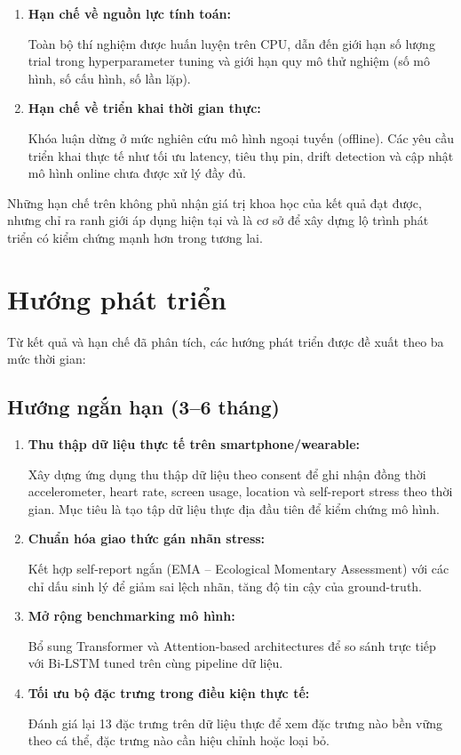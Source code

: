 \begin{enumerate}
    \item \textbf{Hạn chế về nguồn lực tính toán:}
    
    Toàn bộ thí nghiệm được huấn luyện trên CPU, dẫn đến giới hạn số lượng trial trong hyperparameter tuning và giới hạn quy mô thử nghiệm (số mô hình, số cấu hình, số lần lặp).

    \item \textbf{Hạn chế về triển khai thời gian thực:}
    
    Khóa luận dừng ở mức nghiên cứu mô hình ngoại tuyến (offline). Các yêu cầu triển khai thực tế như tối ưu latency, tiêu thụ pin, drift detection và cập nhật mô hình online chưa được xử lý đầy đủ.
\end{enumerate}

Những hạn chế trên không phủ nhận giá trị khoa học của kết quả đạt được, nhưng chỉ ra ranh giới áp dụng hiện tại và là cơ sở để xây dựng lộ trình phát triển có kiểm chứng mạnh hơn trong tương lai.

\section{Hướng phát triển}
\label{sec:future_work}

Từ kết quả và hạn chế đã phân tích, các hướng phát triển được đề xuất theo ba mức thời gian:

\subsection{Hướng ngắn hạn (3--6 tháng)}

\begin{enumerate}
    \item \textbf{Thu thập dữ liệu thực tế trên smartphone/wearable:}
    
    Xây dựng ứng dụng thu thập dữ liệu theo consent để ghi nhận đồng thời accelerometer, heart rate, screen usage, location và self-report stress theo thời gian. Mục tiêu là tạo tập dữ liệu thực địa đầu tiên để kiểm chứng mô hình.

    \item \textbf{Chuẩn hóa giao thức gán nhãn stress:}
    
    Kết hợp self-report ngắn (EMA -- Ecological Momentary Assessment) với các chỉ dấu sinh lý để giảm sai lệch nhãn, tăng độ tin cậy của ground-truth.

    \item \textbf{Mở rộng benchmarking mô hình:}
    
    Bổ sung Transformer và Attention-based architectures để so sánh trực tiếp với Bi-LSTM tuned trên cùng pipeline dữ liệu.

    \item \textbf{Tối ưu bộ đặc trưng trong điều kiện thực tế:}
    
    Đánh giá lại 13 đặc trưng trên dữ liệu thực để xem đặc trưng nào bền vững theo cá thể, đặc trưng nào cần hiệu chỉnh hoặc loại bỏ.
\end{enumerate}

